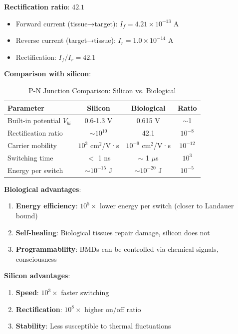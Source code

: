 \documentclass[11pt,a4paper]{article}
\begin{document}
\textbf{Rectification ratio}: $42.1$
\begin{itemize}
\item Forward current (tissue→target): $I_f = 4.21 \times 10^{-13}$ A
\item Reverse current (target→tissue): $I_r = 1.0 \times 10^{-14}$ A
\item Rectification: $I_f / I_r = 42.1$
\end{itemize}

\textbf{Comparison with silicon}:

\begin{table}[H]
\centering
\caption{P-N Junction Comparison: Silicon vs. Biological}
\begin{tabular}{lccc}
\toprule
\textbf{Parameter} & \textbf{Silicon} & \textbf{Biological} & \textbf{Ratio} \\
\midrule
Built-in potential $V_{bi}$ & 0.6-1.3 V & 0.615 V & $\sim$1 \\
Rectification ratio & $\sim 10^{10}$ & 42.1 & $10^{-8}$ \\
Carrier mobility & $10^3$ cm$^2$/V·s & $10^{-9}$ cm$^2$/V·s & $10^{-12}$ \\
Switching time & $<$ 1 ns & $\sim$ 1 $\mu$s & $10^3$ \\
Energy per switch & $\sim 10^{-15}$ J & $\sim 10^{-20}$ J & $10^{-5}$ \\
\bottomrule
\end{tabular}
\end{table}

\textbf{Biological advantages}:
\begin{enumerate}
\item \textbf{Energy efficiency}: $10^5\times$ lower energy per switch (closer to Landauer bound)
\item \textbf{Self-healing}: Biological tissues repair damage, silicon does not
\item \textbf{Programmability}: BMDs can be controlled via chemical signals, consciousness
\end{enumerate}

\textbf{Silicon advantages}:
\begin{enumerate}
\item \textbf{Speed}: $10^3\times$ faster switching
\item \textbf{Rectification}: $10^8\times$ higher on/off ratio
\item \textbf{Stability}: Less susceptible to thermal fluctuations
\end{enumerate}
\end{document}
